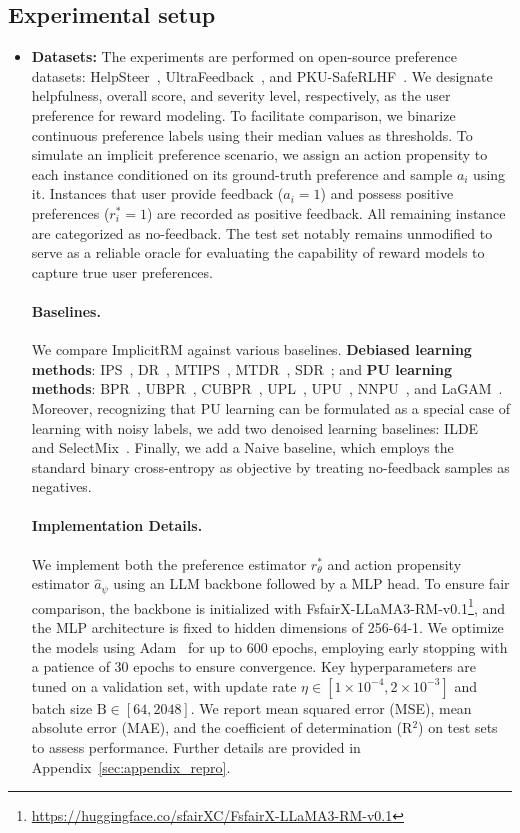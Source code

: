 \documentclass[]{arxiv_singlecolumn}
\theoremstyle{plain}
\theoremstyle{definition}
\theoremstyle{remark}
\begin{document}
\subsection{Experimental setup}
\begin{itemize}[leftmargin=*]
    \item \textbf{Datasets:} The experiments are performed on open-source preference datasets: HelpSteer~\citep{Helpsteer}, UltraFeedback~\citep{Ultrafeedback}, and PKU-SafeRLHF~\citep{PKUSafeRLHF}. We designate helpfulness, overall score, and severity level, respectively, as the user preference for reward modeling. To facilitate comparison, we binarize continuous preference labels using their median values as thresholds.
    To simulate an implicit preference scenario, we assign an action propensity to each instance conditioned on its ground-truth preference and sample $a_i$ using it. Instances that user provide feedback ($a_i=1$) and possess positive preferences ($r^*_i=1$) are recorded as positive feedback. All remaining instance are categorized as no-feedback.
    The test set notably remains unmodified to serve as a reliable oracle for evaluating the capability of reward models to capture true user preferences.

\paragraph{Baselines.}
We compare ImplicitRM against various baselines.  \textbf{Debiased learning methods}: IPS~\citep{ips}, DR~\citep{dr}, MTIPS~\citep{mtlips}, MTDR~\citep{mtlips}, SDR~\citep{li2023stabledr}; 
and  \textbf{PU learning methods}: BPR~\citep{bpr}, UBPR~\citep{ubpr}, CUBPR~\citep{ubpr}, UPL~\citep{pure}, UPU~\citep{upu}, NNPU~\citep{nnpu}, and LaGAM~\citep{lagam}. Moreover, recognizing that PU learning can be formulated as a special case of learning with noisy labels, we add two denoised learning baselines: ILDE~\citep{ilde} and SelectMix~\citep{selectmix}. Finally, we add a Naive baseline, which employs the standard binary cross-entropy as objective by treating no-feedback samples as negatives.


\paragraph{Implementation Details.}
We implement both the preference estimator $r^*_\theta$ and action propensity estimator $\hat{a}_\psi$ using an LLM backbone followed by a MLP head. To ensure fair comparison, the backbone is initialized with FsfairX-LLaMA3-RM-v0.1\footnote{\tiny\url{https://huggingface.co/sfairXC/FsfairX-LLaMA3-RM-v0.1}}, and the MLP architecture is fixed to hidden dimensions of 256-64-1. We optimize the models using Adam~\citep{adam} for up to 600 epochs, employing early stopping with a patience of 30 epochs to ensure convergence. Key hyperparameters are tuned on a validation set, with update rate $\eta \in [1\times 10^{-4}, 2\times 10^{-3}]$ and batch size $\mathrm{B} \in [64, 2048]$. We report mean squared error (MSE), mean absolute error (MAE), and the coefficient of determination (R$^2$) on test sets to assess performance.  Further details are provided in Appendix~\ref{sec:appendix_repro}.
\end{itemize}
\end{document}
